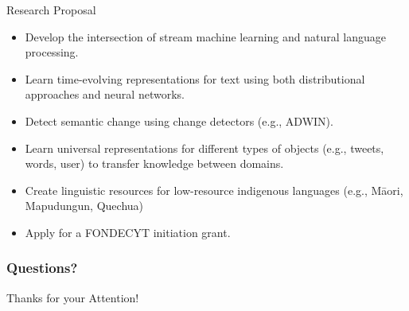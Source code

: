 \documentclass[handout]{beamer}
\begin{document}
\begin{frame}{Research Proposal}
\begin{scriptsize}

\begin{itemize}
 \item Develop the intersection of stream machine learning and natural language processing. 
 \item Learn time-evolving representations for text using both distributional approaches and neural networks.
 \item Detect semantic change using change detectors (e.g., ADWIN).
 \item Learn universal representations for different types of objects (e.g., tweets, words, user) to transfer knowledge between domains.
 \item Create linguistic resources for low-resource indigenous languages (e.g., M\={a}ori, Mapudungun, Quechua)
 \item Apply for a FONDECYT initiation grant. 
\end{itemize}
\end{scriptsize}

\end{frame}





\begin{frame}
\frametitle{Questions?}
\begin{center}\LARGE Thanks for your Attention!\\  \end{center}



\end{frame}




\end{document}
